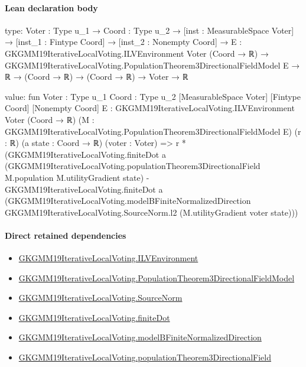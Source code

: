 \documentclass[10pt]{article}
\begin{document}
\paragraph{Lean declaration body}
\begin{ReviewVerbatim}
type:
{Voter : Type u_1} →
  {Coord : Type u_2} →
    [inst : MeasurableSpace Voter] →
      [inst_1 : Fintype Coord] →
        [inst_2 : Nonempty Coord] →
          {E : GKGMM19IterativeLocalVoting.ILVEnvironment Voter (Coord → ℝ)} →
            GKGMM19IterativeLocalVoting.PopulationTheorem3DirectionalFieldModel E →
              ℝ → (Coord → ℝ) → (Coord → ℝ) → Voter → ℝ

value:
fun {Voter : Type u_1} {Coord : Type u_2} [MeasurableSpace Voter] [Fintype Coord] [Nonempty Coord]
    {E : GKGMM19IterativeLocalVoting.ILVEnvironment Voter (Coord → ℝ)}
    (M : GKGMM19IterativeLocalVoting.PopulationTheorem3DirectionalFieldModel E) (r : ℝ) (a state : Coord → ℝ)
    (voter : Voter) =>
  r *
    (GKGMM19IterativeLocalVoting.finiteDot a
        (GKGMM19IterativeLocalVoting.populationTheorem3DirectionalField M.population M.utilityGradient state) -
      GKGMM19IterativeLocalVoting.finiteDot a
        (GKGMM19IterativeLocalVoting.modelBFiniteNormalizedDirection GKGMM19IterativeLocalVoting.SourceNorm.l2
          (M.utilityGradient voter state)))
\end{ReviewVerbatim}

\paragraph{Direct retained dependencies}
\begin{itemize}\raggedright
\item \hyperlink{governing-declaration-df2ca62df1846667}{GKGMM19\allowbreak{}Iterative\allowbreak{}Local\allowbreak{}Voting.\allowbreak{}ILV\allowbreak{}Environment}
\item \hyperlink{governing-declaration-30327078fcfa0789}{GKGMM19\allowbreak{}Iterative\allowbreak{}Local\allowbreak{}Voting.\allowbreak{}Population\allowbreak{}Theorem3\allowbreak{}Directional\allowbreak{}Field\allowbreak{}Model}
\item \hyperlink{governing-declaration-6fa4ab9852321b03}{GKGMM19\allowbreak{}Iterative\allowbreak{}Local\allowbreak{}Voting.\allowbreak{}Source\allowbreak{}Norm}
\item \hyperlink{governing-declaration-267a6c8890d3d4b5}{GKGMM19\allowbreak{}Iterative\allowbreak{}Local\allowbreak{}Voting.\allowbreak{}finite\allowbreak{}Dot}
\item \hyperlink{governing-declaration-20e8ece513543e43}{GKGMM19\allowbreak{}Iterative\allowbreak{}Local\allowbreak{}Voting.\allowbreak{}model\allowbreak{}B\allowbreak{}Finite\allowbreak{}Normalized\allowbreak{}Direction}
\item \hyperlink{governing-declaration-2aecbc804ca585b9}{GKGMM19\allowbreak{}Iterative\allowbreak{}Local\allowbreak{}Voting.\allowbreak{}population\allowbreak{}Theorem3\allowbreak{}Directional\allowbreak{}Field}
\end{itemize}
\hypertarget{governing-declaration-f8078eb1870f8a52}{}
\end{document}
